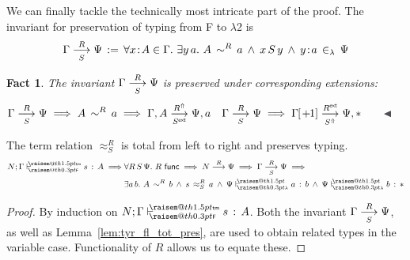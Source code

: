 \documentclass[a4paper,UKenglish]{lipics-v2016}
\makeatletter
\newcommand{\ms}{\,}
\newcommand{\mrel}[1]{\mathrel{\ms #1 \ms}}
\newcommand{\OF}{\mrel{:}}
\newcommand{\mAnd}{\mrel{\wedge}}
\newcommand{\mAll}[1]{\ensuremath{\forall} #1.\ms\ms}
\newcommand{\mEx}[1]{\ensuremath{\exists} #1.\ms\ms}
\newcommand{\eqdef}{\mrel{:=}}
\newcommand{\SysL}{$\lambda$2\xspace}
\newcommand{\tm}{\mathsf{tm}}
\newcommand{\of}{\ensuremath{\!:\!}}
\newcommand{\cc}[2]{#1;#2} %
\newcommand{\raisemath}[1]{\mathpalette{\raisem@th{#1}}}
\newcommand{\raisem@th}[3]{\raisebox{#1}{\ensuremath{#2#3}}}
\newcommand{\tsAnnot}[2]{\vdash\hspace{-.7em}^{\raisemath{1.5pt}{\scriptscriptstyle{#2}}}_{\raisemath{0.3pt}{\scriptscriptstyle{#1}}}} %
\newcommand{\tyF}{\tsAnnot{\mathsf{F}}{\tm}}  %
\newcommand{\typingF}[3]{\ensuremath{{#1} \mathrel{\tyF} #2 \OF #3}}
\newcommand{\tyL}{\tsAnnot{\lambda}{}} %
\newcommand{\typingL}[3]{\ensuremath{{#1} \mathrel{\tyL} #2 \OF #3}}
\newcommand{\inL}{\mrel{\in_{\lambda}}}
\newcommand{\tyr}{\mathrel{\sim}}
\newcommand{\tmr}{\mathrel{\approx}}
\newcommand{\Rext}[1]{\ensuremath{#1^{\mathsf{ext}}}}
\newcommand{\Rshift}[1]{\ensuremath{#1^{\Uparrow}}}
\newcommand{\tyctxrelFL}[3]{\ensuremath{#1\mathrel{\mathop{\longrightarrow}^{#2}\limits}#3}}
\newcommand{\tmctxrelFL}[4]{\ensuremath{#1\mathrel{\mathop{\longrightarrow}^{#2}_{#3}\limits}#4}}
\newcommand{\Prp}{\ensuremath{\textrm{\textasteriskcentered}}}
\newcommand{\subst}[1]{\hphantom{|}\!\![{#1}]}
\newcommand{\shift}{\ensuremath{\hspace{0.1em}\mathsf{+}\hspace{0.08em}\!1}}
\theoremstyle{plain}
\newtheorem{fact}[theorem]{Fact}
\makeatother
\begin{document}
We can finally tackle the technically most intricate part of the proof.
The invariant for preservation of typing from F to \SysL is
\begin{align*}
  \tmctxrelFL{\Gamma}{R}{S}{\Psi} \eqdef \mAll {x \of A \in \Gamma} \mEx{y\,a} A\,\tyr^R\,a \mAnd x\,S\,y \mAnd y \of a \inL \Psi
\end{align*}
\begin{fact}
  \label{fac:inv-tmfl-ext}
  The invariant $\tmctxrelFL{\Gamma}{R}{S}{\Psi}$ is preserved under corresponding extensions:
  \begin{align*}
  &\tmctxrelFL{\Gamma}{R}{S}{\Psi} \implies A\,\tyr^R\,a \implies \tmctxrelFL{\Gamma,A}{\Rshift{R}}{\Rext{S}}{\Psi,a} & &\tmctxrelFL{\Gamma}{R}{S}{\Psi} \implies \tmctxrelFL{\Gamma\subst{\shift}}{\Rext{R}}{\Rshift{S}}{\Psi,\Prp}\tag*{\qedsymbol}
  \end{align*}
\end{fact}
\begin{lemma}
  The term relation $\tmr^R_S$ is total from left to right and preserves typing.
  \begin{align*}
    \typingF{\cc{N}{\Gamma}}{s}{A} \implies &\mAll{R\,S\,\Psi} R\ms\ms\mathsf{func} \implies \tyctxrelFL{N}{R}{\Psi} \implies \tmctxrelFL{\Gamma}{R}{S}{\Psi} \implies \\
                                            &\mEx{a\,b} A\,\tyr^R\,b \mAnd s\,\tmr^R_S\,a \mAnd \typingL{\Psi}{a}{b} \mAnd \typingL{\Psi}{b}{\Prp}
  \end{align*}
\end{lemma}
\begin{proof}
  By induction on $\typingF{\cc{N}{\Gamma}}{s}{A}$.
  Both the invariant $\tmctxrelFL{\Gamma}{R}{S}{\Psi}$, as well as Lemma~\ref{lem:tyr_fl_tot_pres}, are used to obtain related types in the variable case.
  Functionality of $R$ allows us to equate these.
\end{proof}
\end{document}
